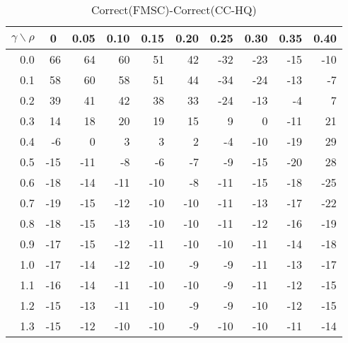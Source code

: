 \documentclass[12pt]{article}
\begin{document}
%
\begin{table}[!tbp]
\caption{Correct(FMSC)-Correct(CC-HQ)}
 \begin{center}
 \begin{tabular}{r|rrrrrrrrr}\hline\hline
\multicolumn{1}{c|}{$\gamma\backslash\rho$}&\multicolumn{1}{c}{0}&\multicolumn{1}{c}{0.05}&\multicolumn{1}{c}{0.10}&\multicolumn{1}{c}{0.15}&\multicolumn{1}{c}{0.20}&\multicolumn{1}{c}{0.25}&\multicolumn{1}{c}{0.30}&\multicolumn{1}{c}{0.35}&\multicolumn{1}{c}{0.40}\tabularnewline
\hline
0.0& 66& 64& 60& 51& 42&-32&-23&-15&-10\tabularnewline
0.1& 58& 60& 58& 51& 44&-34&-24&-13& -7\tabularnewline
0.2& 39& 41& 42& 38& 33&-24&-13& -4&  7\tabularnewline
0.3& 14& 18& 20& 19& 15&  9&  0&-11& 21\tabularnewline
0.4& -6&  0&  3&  3&  2& -4&-10&-19& 29\tabularnewline
0.5&-15&-11& -8& -6& -7& -9&-15&-20& 28\tabularnewline
0.6&-18&-14&-11&-10& -8&-11&-15&-18&-25\tabularnewline
0.7&-19&-15&-12&-10&-10&-11&-13&-17&-22\tabularnewline
0.8&-18&-15&-13&-10&-10&-11&-12&-16&-19\tabularnewline
0.9&-17&-15&-12&-11&-10&-10&-11&-14&-18\tabularnewline
1.0&-17&-14&-12&-10& -9& -9&-11&-13&-17\tabularnewline
1.1&-16&-14&-11&-10&-10& -9&-11&-12&-15\tabularnewline
1.2&-15&-13&-11&-10& -9& -9&-10&-12&-15\tabularnewline
1.3&-15&-12&-10&-10& -9&-10&-10&-11&-14\tabularnewline
\hline
\end{tabular}

\end{center}

\end{table}
\end{document}
